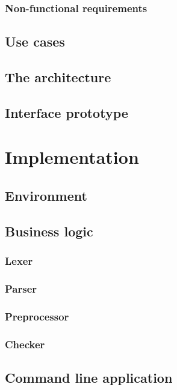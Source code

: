 \documentclass[english,engineering]{wizthesis}
\begin{document}
\subsection{Non-functional requirements}

\section{Use cases}

\section{The architecture}

\section{Interface prototype}

\chapter{Implementation}

\section{Environment}

\section{Business logic}

\subsection{Lexer}

\subsection{Parser}

\subsection{Preprocessor}

\subsection{Checker}

\section{Command line application}
\end{document}
